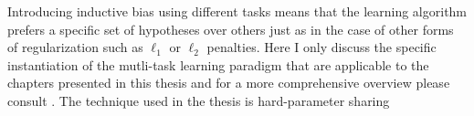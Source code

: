 Introducing inductive bias using different tasks means that the learning algorithm prefers a specific set of hypotheses over others just as in the case of other forms of regularization such as $\ell_1$ or $\ell_2$ penalties. Here I only discuss the specific instantiation of the mutli-task learning paradigm that are applicable to the chapters presented in this thesis and for a more comprehensive overview please consult \cite{ruder2017overview}. The technique used in the thesis
is hard-parameter sharing \cite{caruana1997multitask}